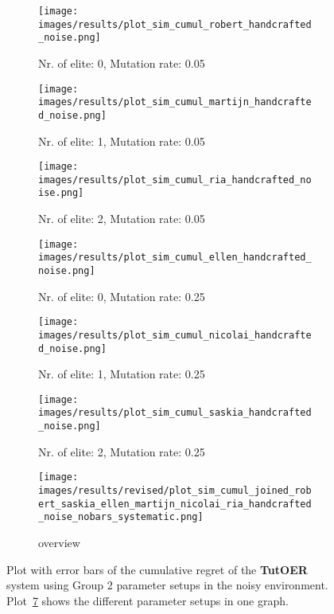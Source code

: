 
\begin{figure}[ht]
	\begin{subfigure}{0.48\linewidth}
	\texttt{[image: images/results/plot\_sim\_cumul\_robert\_handcrafted\_noise.png]}
	\caption{Nr. of elite: 0, Mutation rate: 0.05}
	\label{fig:cumul_handcrafted_noise_robert}
	\end{subfigure}
	\hfill
	\begin{subfigure}{0.48\linewidth}
	\texttt{[image: images/results/plot\_sim\_cumul\_martijn\_handcrafted\_noise.png]}
	\caption{Nr. of elite: 1, Mutation rate: 0.05}
	\label{fig:cumul_handcrafted_noise_martijn}
	\end{subfigure}
	\begin{subfigure}{0.48\linewidth}
	\texttt{[image: images/results/plot\_sim\_cumul\_ria\_handcrafted\_noise.png]}
	\caption{Nr. of elite: 2, Mutation rate: 0.05}
	\label{fig:cumul_handcrafted_noise_ria}
	\end{subfigure}
	\hfill
	\begin{subfigure}{0.48\linewidth}
	\texttt{[image: images/results/plot\_sim\_cumul\_ellen\_handcrafted\_noise.png]}
	\caption{Nr. of elite: 0, Mutation rate: 0.25}
	\label{fig:cumul_handcrafted_noise_ellen}
	\end{subfigure}
	\begin{subfigure}{0.48\linewidth}
	\texttt{[image: images/results/plot\_sim\_cumul\_nicolai\_handcrafted\_noise.png]}
	\caption{Nr. of elite: 1, Mutation rate: 0.25}
	\label{fig:cumul_handcrafted_noise_nicolai}
	\end{subfigure}
	\hfill
	\begin{subfigure}{0.48\linewidth}
	\texttt{[image: images/results/plot\_sim\_cumul\_saskia\_handcrafted\_noise.png]}
	\caption{Nr. of elite: 2, Mutation rate: 0.25}
	\label{fig:cumul_handcrafted_noise_saskia}
	\end{subfigure}
	\begin{subfigure}{\linewidth}
	\texttt{[image: images/results/revised/plot\_sim\_cumul\_joined\_robert\_saskia\_ellen\_martijn\_nicolai\_ria\_handcrafted\_noise\_nobars\_systematic.png]}
	\caption{overview}
	\label{fig:cumul_handcrafted_noise_overview_group2}
	\end{subfigure}
	\caption[Cumulative regret in noisy simulated environment for group 2]{Plot with error bars of the cumulative regret of the \textbf{TutOER}
	system using Group 2 parameter setups in the noisy environment.
	Plot~\ref{fig:cumul_handcrafted_noise_overview_group2} shows the
	different parameter setups in one graph.}
	\label{fig:cumul_handcrafted_noise_container_group2}
\end{figure}


